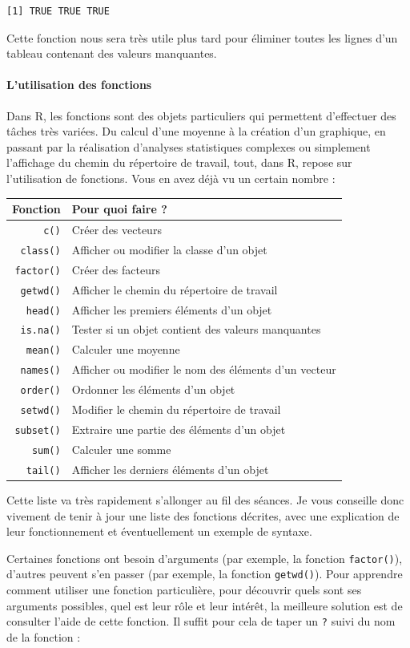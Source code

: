 \documentclass[
  a4paper,
]{article}
\begin{document}
\begin{verbatim}
[1] TRUE TRUE TRUE
\end{verbatim}

Cette fonction nous sera très utile plus tard pour éliminer toutes les lignes d'un tableau contenant des valeurs manquantes.

\hypertarget{functions}{%
\paragraph{L'utilisation des fonctions}\label{functions}}

Dans R, les fonctions sont des objets particuliers qui permettent d'effectuer des tâches très variées. Du calcul d'une moyenne à la création d'un graphique, en passant par la réalisation d'analyses statistiques complexes ou simplement l'affichage du chemin du répertoire de travail, tout, dans R, repose sur l'utilisation de fonctions. Vous en avez déjà vu un certain nombre :

\begin{longtable}[]{@{}rl@{}}
\toprule
Fonction & Pour quoi faire ?\tabularnewline
\midrule
\endhead
\texttt{c()} & Créer des vecteurs\tabularnewline
\texttt{class()} & Afficher ou modifier la classe d'un objet\tabularnewline
\texttt{factor()} & Créer des facteurs\tabularnewline
\texttt{getwd()} & Afficher le chemin du répertoire de travail\tabularnewline
\texttt{head()} & Afficher les premiers éléments d'un objet\tabularnewline
\texttt{is.na()} & Tester si un objet contient des valeurs manquantes\tabularnewline
\texttt{mean()} & Calculer une moyenne\tabularnewline
\texttt{names()} & Afficher ou modifier le nom des éléments d'un vecteur\tabularnewline
\texttt{order()} & Ordonner les éléments d'un objet\tabularnewline
\texttt{setwd()} & Modifier le chemin du répertoire de travail\tabularnewline
\texttt{subset()} & Extraire une partie des éléments d'un objet\tabularnewline
\texttt{sum()} & Calculer une somme\tabularnewline
\texttt{tail()} & Afficher les derniers éléments d'un objet\tabularnewline
\bottomrule
\end{longtable}

Cette liste va très rapidement s'allonger au fil des séances. Je vous conseille donc vivement de tenir à jour une liste des fonctions décrites, avec une explication de leur fonctionnement et éventuellement un exemple de syntaxe.

Certaines fonctions ont besoin d'arguments (par exemple, la fonction \texttt{factor()}), d'autres peuvent s'en passer (par exemple, la fonction \texttt{getwd()}). Pour apprendre comment utiliser une fonction particulière, pour découvrir quels sont ses arguments possibles, quel est leur rôle et leur intérêt, la meilleure solution est de consulter l'aide de cette fonction. Il suffit pour cela de taper un \texttt{?} suivi du nom de la fonction :
\end{document}
